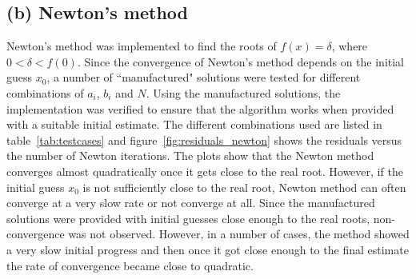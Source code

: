 \documentclass[11pt, oneside]{article}
\begin{document}
\subsection*{(b) Newton's method}
Newton's method was implemented to find the roots of $f(x) = \delta$, where $0 < \delta < f(0)$. Since the convergence of Newton's method depends on the initial guess $x_0$, a number of ``manufactured" solutions were tested for different combinations of $a_i$, $b_i$ and $N$. Using the manufactured solutions, the implementation was verified to ensure that the algorithm works when provided with a suitable initial estimate. The different combinations used are listed in table~\ref{tab:testcases} and figure~\ref{fig:residuals_newton} shows the residuals versus the number of Newton iterations. The plots show that the Newton method converges almost quadratically once it gets close to the real root. However, if the initial guess $x_0$ is not sufficiently close to the real root, Newton method can often converge at a very slow rate or not converge at all. Since the manufactured solutions were provided with initial guesses close enough to the real roots, non-convergence was not observed. However, in a number of cases, the method showed a very slow initial progress and then once it got close enough to the final estimate the rate of convergence became close to quadratic.
\end{document}
